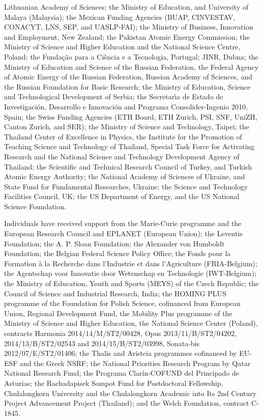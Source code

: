 \begin{acknowledgments}
  Lithuanian Academy of Sciences; the Ministry of Education, and
  University of Malaya (Malaysia); the Mexican Funding Agencies (BUAP,
  CINVESTAV, CONACYT, LNS, SEP, and UASLP-FAI); the Ministry of
  Business, Innovation and Employment, New Zealand; the Pakistan
  Atomic Energy Commission; the Ministry of Science and Higher
  Education and the National Science Centre, Poland; the
  Funda\c{c}\~ao para a Ci\^encia e a Tecnologia, Portugal; JINR,
  Dubna; the Ministry of Education and Science of the Russian
  Federation, the Federal Agency of Atomic Energy of the Russian
  Federation, Russian Academy of Sciences, and the Russian Foundation
  for Basic Research; the Ministry of Education, Science and
  Technological Development of Serbia; the Secretar\'{\i}a de Estado
  de Investigaci\'on, Desarrollo e Innovaci\'on and Programa
  Consolider-Ingenio 2010, Spain; the Swiss Funding Agencies (ETH
  Board, ETH Zurich, PSI, SNF, UniZH, Canton Zurich, and SER); the
  Ministry of Science and Technology, Taipei; the Thailand Center of
  Excellence in Physics, the Institute for the Promotion of Teaching
  Science and Technology of Thailand, Special Task Force for
  Activating Research and the National Science and Technology
  Development Agency of Thailand; the Scientific and Technical
  Research Council of Turkey, and Turkish Atomic Energy Authority; the
  National Academy of Sciences of Ukraine, and State Fund for
  Fundamental Researches, Ukraine; the Science and Technology
  Facilities Council, UK; the US Department of Energy, and the US
  National Science Foundation.

  Individuals have received support from the Marie-Curie programme and
  the European Research Council and EPLANET (European Union); the
  Leventis Foundation; the A. P. Sloan Foundation; the Alexander von
  Humboldt Foundation; the Belgian Federal Science Policy Office; the
  Fonds pour la Formation \`a la Recherche dans l'Industrie et dans
  l'Agriculture (FRIA-Belgium); the Agentschap voor Innovatie door
  Wetenschap en Technologie (IWT-Belgium); the Ministry of Education,
  Youth and Sports (MEYS) of the Czech Republic; the Council of
  Science and Industrial Research, India; the HOMING PLUS programme of
  the Foundation for Polish Science, cofinanced from European Union,
  Regional Development Fund, the Mobility Plus programme of the
  Ministry of Science and Higher Education, the National Science
  Center (Poland), contracts Harmonia 2014/14/M/ST2/00428, Opus
  2013/11/B/ST2/04202, 2014/13/B/ST2/02543 and 2014/15/B/ST2/03998,
  Sonata-bis 2012/07/E/ST2/01406; the Thalis and Aristeia programmes
  cofinanced by EU-ESF and the Greek NSRF; the National Priorities
  Research Program by Qatar National Research Fund; the Programa
  Clar\'in-COFUND del Principado de Asturias; the Rachadapisek Sompot
  Fund for Postdoctoral Fellowship, Chulalongkorn University and the
  Chulalongkorn Academic into Its 2nd Century Project Advancement
  Project (Thailand); and the Welch Foundation, contract C-1845.

\end{acknowledgments}
